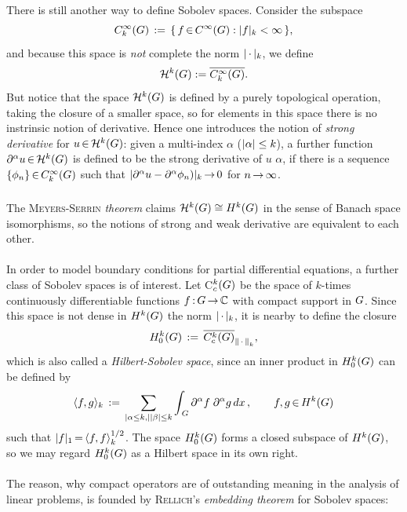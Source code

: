 \documentclass[11pt,twoside]{article}
\begin{document}
\paragraph*{}
There is still another way to define Sobolev spaces.
Consider the subspace
\[
C_{k}^{\infty}(\G) \eqdef \{\, f \xeof \SF: \abs{f} _k < \infty \,\},
\]
and because this space is \textit{not} complete
{\wrt} the norm $\abs{\,\cdot\,} _k$,
we define
\[
{\mathcal{H}}^k(G) := \overline{C_{k}^{\infty}(G)}.
\]
But notice that the space ${\mathcal{H}}^k(G)$ is defined by 
a purely topological operation,
{\ie} taking the closure of a smaller space,
so for elements in this space there is no instrinsic notion of derivative.
Hence one introduces the notion of \textit{strong derivative} for
$u {\,\in\,} {\mathcal{H}}^{k}(G)$: 
given a multi-index $\alpha$ ($\abs{\alpha} \leq k$),
a further function $\partial^{\alpha} u {\,\in\,} {\mathcal{H}}^k(G)$
is defined to be the strong derivative of $u$ {\wrt} $\alpha$,
if there is a sequence $\{\phi_n\} {\,\in\,} C_k^{\infty}(G)$
such that $\abs{\PA u - \PA \phi_n)} _k \xto 0$ for $n {\,\to\,} \infty$.

\subparagraph*{}
The \textsc{Meyers-Serrin} \textit{theorem} claims
$
{\mathcal{H}}^k(G) \cong H^k(G)
$
in the sense of Banach space isomorphisms,
so the notions of strong and weak derivative are equivalent to each other.

\paragraph*{}
In order to model boundary conditions for partial differential equations,
a further class of Sobolev spaces is of interest.
Let C$_c^k(G)$ be the space
of $k$-times continuously differentiable functions $f{\,:\,}G {\,\to\,} {\mathbb{C}}$
with compact support in $G$.
Since this space is not dense in $H^k(G)$ {\wrt} the norm $\abs{\,\cdot\,} _k$,
it is nearby to define the closure
\[
H_0^{k}(G) \,:=\, \overline{C_c^k(G)} _{\left\lVert \,\cdot\, \right\rVert_k},
\]
which is also called a \textit{Hilbert-Sobolev space},
since an inner product in $H_0^{k}(G)$ can be defined by
\[
\scalar{f}{g} _k \eqdef \sum_{\abs{\alpha}\leq k, \abs{\beta} \leq k}
 \int_{\,\G} \partial^{\alpha} f \; \partial^{\alpha} g \, dx\,,
\quad \quad f,g \xeof H^k(\G)
\]
such that $\abs{f} _1 \eq \scalar{f}{f}_k^{1/2}$.
The space $H_0^{k}(G)$ forms a closed subspace of $H^k(G)$,
so we may regard $H_0^{k}(G)$ as a Hilbert space in its own right.

\paragraph*{}
The reason,
why compact operators are of outstanding meaning
in the analysis of linear problems,
is founded by \textsc{Rellich}'s \textit{embedding theorem} for Sobolev spaces:
\end{document}
